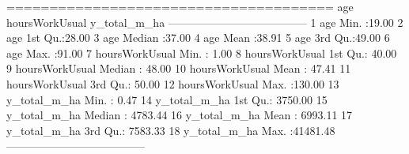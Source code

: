 
======================================
   age hoursWorkUsual   y_total_m_ha  
--------------------------------------
1           age         Min. :19.00   
2           age        1st Qu.:28.00  
3           age        Median :37.00  
4           age         Mean :38.91   
5           age        3rd Qu.:49.00  
6           age         Max. :91.00   
7      hoursWorkUsual   Min. : 1.00   
8      hoursWorkUsual  1st Qu.: 40.00 
9      hoursWorkUsual  Median : 48.00 
10     hoursWorkUsual   Mean : 47.41  
11     hoursWorkUsual  3rd Qu.: 50.00 
12     hoursWorkUsual   Max. :130.00  
13      y_total_m_ha    Min. : 0.47   
14      y_total_m_ha  1st Qu.: 3750.00
15      y_total_m_ha  Median : 4783.44
16      y_total_m_ha   Mean : 6993.11 
17      y_total_m_ha  3rd Qu.: 7583.33
18      y_total_m_ha   Max. :41481.48 
--------------------------------------
